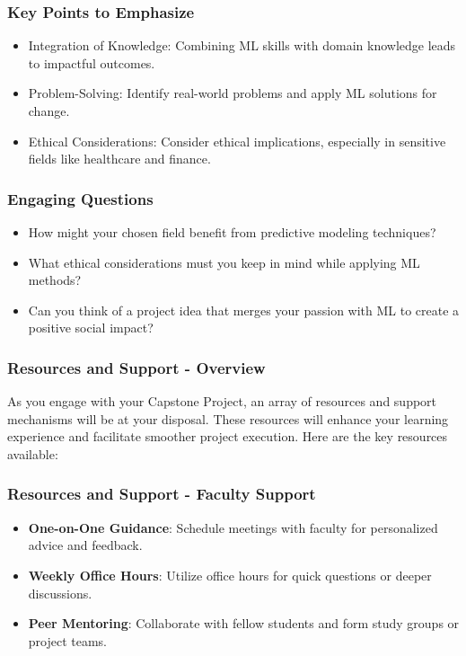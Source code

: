 \documentclass[aspectratio=169]{beamer}
\begin{document}
\begin{frame}[fragile]
    \frametitle{Key Points to Emphasize}
    \begin{itemize}
        \item Integration of Knowledge: Combining ML skills with domain knowledge leads to impactful outcomes.
        \item Problem-Solving: Identify real-world problems and apply ML solutions for change.
        \item Ethical Considerations: Consider ethical implications, especially in sensitive fields like healthcare and finance.
    \end{itemize}
\end{frame}

\begin{frame}[fragile]
    \frametitle{Engaging Questions}
    \begin{itemize}
        \item How might your chosen field benefit from predictive modeling techniques?
        \item What ethical considerations must you keep in mind while applying ML methods?
        \item Can you think of a project idea that merges your passion with ML to create a positive social impact?
    \end{itemize}
\end{frame}

\begin{frame}[fragile]
    \frametitle{Resources and Support - Overview}
    As you engage with your Capstone Project, an array of resources and support mechanisms will be at your disposal. These resources will enhance your learning experience and facilitate smoother project execution. Here are the key resources available:
\end{frame}

\begin{frame}[fragile]
    \frametitle{Resources and Support - Faculty Support}
    \begin{itemize}
        \item \textbf{One-on-One Guidance}: Schedule meetings with faculty for personalized advice and feedback.
        \item \textbf{Weekly Office Hours}: Utilize office hours for quick questions or deeper discussions.
        \item \textbf{Peer Mentoring}: Collaborate with fellow students and form study groups or project teams.
    \end{itemize}
\end{frame}
\end{document}
